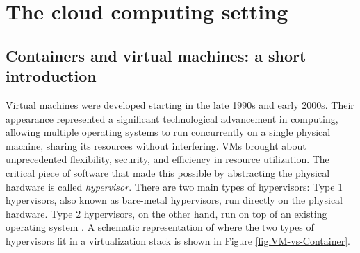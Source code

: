 \chapter{The cloud computing setting}\label{chap:cloudcomputing}


\section{Containers and virtual machines: a short introduction}\label{sec:chpt1-containers}



Virtual machines were developed starting in the late 1990s and early 2000s.
Their appearance represented a significant technological advancement in
computing, allowing multiple operating systems to run concurrently on a single
physical machine, sharing its resources without interfering. VMs brought about
unprecedented flexibility, security, and efficiency in resource utilization. The
critical piece of software that made this possible by abstracting the physical
hardware is called \textit{hypervisor}. There are two main types of hypervisors:
Type 1 hypervisors, also known as bare-metal hypervisors, run directly on the
physical hardware. Type 2 hypervisors, on the other hand, run on top of an
existing operating system \cite{rodriguezharo-2012}. A schematic representation
of where the two types of hypervisors fit in a virtualization stack is shown in
Figure \ref{fig:VM-vs-Container}. 

